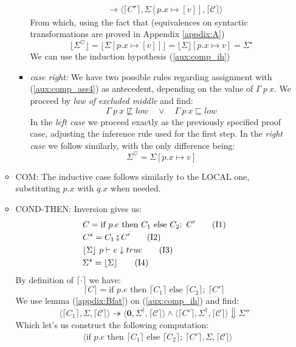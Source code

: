 \documentclass[12pt,a4paper,twoside]{book}
\newcommand{\heart}{\heartsuit}
\begin{document}
\begin{itemize}
\begin{itemize}
\begin{itemize}
\begin{align*}
&\rightarrow\langle \lceil C^\star \rceil, \Sigma[p.x \mapsto [v]], \lceil \mathscr{C} \rceil \rangle
\end{align*}
From which, using the fact that (equivalences on syntactic transformations are proved in Appendix \ref{appdix:A})
$$
		\lfloor\Sigma^\heart\rfloor = \lfloor \Sigma[p.x \mapsto [v]] \rfloor = \lfloor \Sigma \rfloor[p.x \mapsto v] = \Sigma^\star
$$
We can use the induction hypothesis (\ref{aux:comp_ih})
\item \emph{case right:} We have two possible rules regarding assignment with (\ref{aux:comp_ass4}) as antecedent, depending on the value of $\Gamma~p~x$. We proceed by \emph{law of excluded middle} and find:
\begin{equation}\label{aux:comp_ass5}
\Gamma~p~x \not\sqsubseteq low \quad \lor \quad
\Gamma~p~x \sqsubseteq low
\end{equation}
In the \emph{left case} we proceed exactly as the previously specified proof case, adjusting the inference rule used for the first step. In the \emph{right case} we follow similarly, with the only difference being:
$$
\Sigma^\heart = \Sigma[p.x\mapsto v]
$$
\end{itemize}
\item COM: The inductive case follows similarly to the LOCAL one, substituting $p.x$ with $q.x$ when needed.
\item COND-THEN: Inversion gives us:
\begin{align}
&C = \text{if } p.e \text{ then } C_1 \text{ else } C_2;~ C' \label{aux:comp_then1}\tag{I1}\\
	&C^\star = C_1 \fatsemi C'\label{aux:comp_then2}\tag{I2}\\
&\lfloor \Sigma \rfloor~p \vdash e \downarrow true \label{aux:comp_then3}\tag{I3}\\
&\Sigma^\star = \lfloor \Sigma \rfloor\label{aux:comp_then4}\tag{I4}
\end{align}
By definition of $\lceil \cdot \rceil$ we have:
$$
\lceil C\rceil = \text{if } p.e \text{ then } \lceil C_1\rceil \text{ else }\lceil C_2\rceil;~ \lceil C'\rceil
$$
We use lemma (\ref{appdix:Bfat}) on (\ref{aux:comp_ih}) and find:
$$
\langle \lceil C_1 \rceil, \Sigma, \lceil \mathscr{C} \rceil \rangle \twoheadrightarrow \langle \boldsymbol{0}, \Sigma^\dag, \lceil \mathscr{C} \rceil \rangle 
\land
\langle \lceil C' \rceil, \Sigma^\dag, \lceil \mathscr{C} \rceil \rangle \Downarrow \Sigma''
$$
Which let's us construct the following computation:
\begin{align*}
&\langle \text{if } p.e \text{ then } \lceil C_1\rceil \text{ else }\lceil C_2\rceil;~ \lceil C'\rceil, \Sigma, \lceil \mathscr{C}\rceil\rangle\\

\end{align*}
\end{itemize}
\end{itemize}
\end{document}
